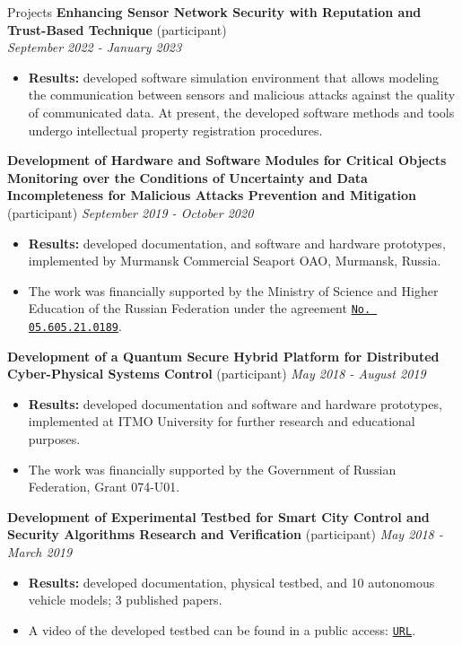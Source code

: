 \documentclass[10pt]{resume} %
\begin{document}
\begin{rSection}{Projects}
{\bf Enhancing Sensor Network Security with Reputation and Trust-Based Technique} (participant)\\ \hspace*{\fill} {\em September 2022 - January 2023}
\vspace{-0.2cm}
\begin{itemize}
\itemsep-0.8em 
\item \textbf{Results:} developed software simulation environment that allows modeling the communication between sensors and malicious attacks against the quality of communicated data. At present, the developed software methods and tools undergo intellectual property registration procedures.   
\end{itemize}

{\bf Development of Hardware and Software Modules for Critical Objects Monitoring over the Conditions of Uncertainty and Data Incompleteness for Malicious Attacks Prevention and Mitigation} (participant) \hspace*{\fill} {\em September 2019 - October 2020}
\vspace{-0.2cm}
\begin{itemize}
\itemsep-0.5em
\item \textbf{Results:} developed documentation, and software and hardware prototypes, implemented by Murmansk Commercial Seaport OAO, Murmansk, Russia.  
\item The work was financially supported by the Ministry of Science and Higher Education of the Russian Federation under the agreement \href{https://fcpir.ru/participation_in_program/contracts/05.605.21.0189/}{\nolinkurl{No. 05.605.21.0189}}. 
\end{itemize}

{\bf Development of a Quantum Secure Hybrid Platform for Distributed Cyber-Physical Systems Control} (participant) \hspace*{\fill} {\em May 2018 - August 2019}
\begin{itemize}
\itemsep-0.5em
\item \textbf{Results:} developed documentation and software and hardware prototypes, implemented at ITMO University for further research and educational purposes.
\item The work was financially supported by the Government of Russian Federation, Grant 074-U01.
\end{itemize}

{\bf Development of Experimental Testbed for Smart City Control and Security Algorithms Research and Verification} (participant) \hfill \hfill {\em May 2018 - March 2019}
\begin{itemize}
\itemsep-0.5em
\item \textbf{Results:} developed documentation, physical testbed, and 10 autonomous vehicle models; 3 published papers. 
\item A video of the developed testbed can be found in a public access: \href{https://vk.com/video-175152723_456239017}{\nolinkurl{URL}}.
\end{itemize}
\end{rSection}
\end{document}
